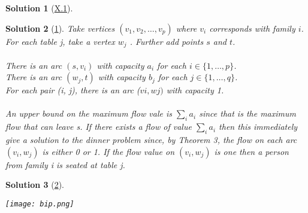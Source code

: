 \documentclass[10pt]{report}
\numberwithin{dummy}{section}
\theoremstyle{ocrenumbox}
\newtheorem{definitionTT}{Solution}[]
\theoremstyle{grayman}
\newenvironment{sol}{\begin{sBox}\begin{definitionTT}}{\end{definitionTT}\end{sBox}}
\begin{document}
\begin{sol}[\hypertarget{solx1}{\hyperlink{exox1}{X.1}}]\leavevmode
\begin{center}
\end{center}
\end{sol}

\begin{sol}[\hypertarget{sol1}{\hyperlink{exo1}{1}}]
 Take vertices $(v_1, v_2, \dots , v_p)$ where $v_i$ corresponds with family $i$. \\
 For each table j, take a vertex $w_j$ . Further add points
$s$ and $t$. \\ \\ 
There is an arc $(s, v_i)$ with capacity $a_i$ for each $i \in\{1,\dots, p\}$.\\
There is an arc $(w_j , t)$ with capacity $b_j$ for each $j \in \{1, \dots , q\}$. \\
For each pair (i, j), there is an arc ($vi, wj )$ with capacity 1.\\ \\
An upper bound on the maximum flow vale is $\sum\limits_{i} a_i$ since that is the maximum flow that can leave s. If there exists a flow of value $\sum\limits_{i} a_i$ then this
immediately give a solution to the dinner problem since, by Theorem 3, the flow on each arc $(v_i, w_j )$ is either 0 or 1. 
If the flow value on $(v_i, w_j )$ is one then a person from family i is seated at table j.
\end{sol}

\begin{sol}[\hypertarget{sol2}{\hyperlink{exo2}{2}}]\phantom{a}\\
\begin{center}
    \texttt{[image: bip.png]}
\end{center}
\end{sol}
\end{document}
